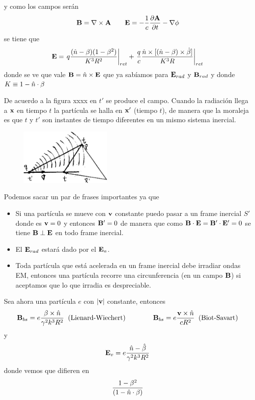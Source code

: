 \documentclass[10pt,oneside]{CBFT_book}
\begin{document}
y como los campos serán 
\[
	\vb{B} = \rotorm{A} \qquad \vb{E} = -\frac{1}{c}\dpar{\vb{A}}{t} - \Nabla\phi
\]
se tiene que 
\[
	\vb{E} = \left. q \frac{ (\hat{n}-\vb{\beta})(1-\beta^2)}{K^3R^2} \right|_{ret} + \left. 
	\frac{q}{c} \frac{\hat{n}\times[ (\hat{n}-\vb{\beta})\times \dot{\vb{\beta}} ]}{K^3R} \right|_{ret}
\]
donde se ve que vale $\vb{B} = \hat{n} \times \vb{E}$ que ya sabíamos para $\vb{E}_{rad}$ y $\vb{B}_{rad}$
y donde $K\equiv 1 - \hat{n}\cdot\vb{\beta} $

De acuerdo a la figura xxxx en $t'$ se produce el campo. Cuando la radiación llega a $\vb{x}$ en tiempo $t$ 
la partícula se halla en $\vb{x}'$ (tiempo $t$), de manera que la moraleja es que $t$ y $t'$ son instantes
de tiempo diferentes en un mismo sistema inercial.

\begin{figure}[htb]
	\begin{center}
	\includegraphics[width=0.4\textwidth]{images/fig_ft1_campo_part_car2.pdf}	 
	\end{center}
	\caption{}
\end{figure} 

Podemos sacar un par de frases importantes ya que 
\begin{itemize}
 \item Si una partícula se mueve con $\vb{v}$ constante puedo pasar a un frame inercial $S'$ donde es 
 $\vb{v}=0$ y entonces $\vb{B}'=0$ de manera que como $\pe{B}{E}=\pe{B'}{E'}=0$ se tiene $\vb{B}\perp\vb{E}$
 en todo frame inercial.
 \item El $\vb{E}_{rad}$ estará dado por el $\vb{E}_a$.
 \item Toda partícula que está acelerada en un frame inercial debe irradiar ondas EM, entonces una partícula
 recorre una circunferencia (en un campo $\vb{B}$) si aceptamos que lo que irradia es despreciable.
\end{itemize}

Sea ahora una partícula $e$ con $|\vb{v}|$ constante, entonces 
\[
	\vb{B}_{bs} = e\frac{\vb{\beta}\times\hat{n}}{\gamma^2k^3R^2} \;\; \text{(Lienard-Wiechert)}
	\qquad \qquad 
	\vb{B}_{bs} = e\frac{\vb{v}\times\hat{n}}{cR^2} \;\; \text{(Biot-Savart)}
\]
y 
\[
	\vb{E}_{v} = e\frac{ \hat{n}- \hat{\beta} }{\gamma^2k^3R^2}
\]
donde vemos que difieren en 
\[
	\frac{1-\beta^2}{(1-\hat{n}\cdot{\vb{\beta}})}
\]
\end{document}
